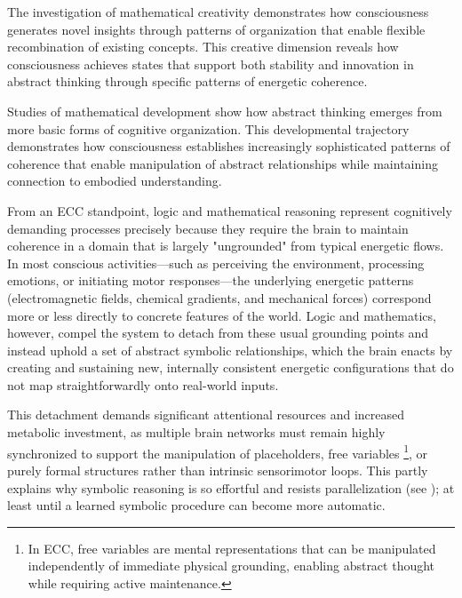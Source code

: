 \begin{refsection}
The investigation of mathematical creativity \cite{Hadamard1945} demonstrates how consciousness generates novel insights through patterns of organization that enable flexible recombination of existing concepts. This creative dimension reveals how consciousness achieves states that support both stability and innovation in abstract thinking through specific patterns of energetic coherence.

Studies of mathematical development \cite{Piaget1952} show how abstract thinking emerges from more basic forms of cognitive organization. This developmental trajectory demonstrates how consciousness establishes increasingly sophisticated patterns of coherence that enable manipulation of abstract relationships while maintaining connection to embodied understanding.

From an ECC standpoint, logic and mathematical reasoning represent cognitively demanding processes precisely because they require the brain to maintain coherence in a domain that is largely "ungrounded" from typical energetic flows. In most conscious activities—such as perceiving the environment, processing emotions, or initiating motor responses—the underlying energetic patterns (electromagnetic fields, chemical gradients, and mechanical forces) correspond more or less directly to concrete features of the world. Logic and mathematics, however, compel the system to detach from these usual grounding points and instead uphold a set of abstract symbolic relationships, which the brain enacts by creating and sustaining new, internally consistent energetic configurations that do not map straightforwardly onto real-world inputs.

This detachment demands significant attentional resources and increased metabolic investment, as multiple brain networks must remain highly synchronized to support the manipulation of placeholders, free variables \footnote{In ECC, free variables are mental representations that can be manipulated independently of immediate physical grounding, enabling abstract thought while requiring active maintenance.}, or purely formal structures rather than intrinsic sensorimotor loops. This partly explains why symbolic reasoning is so effortful and resists parallelization (see \cite{Dehaene2011, kahneman2011thinking}); at least until a learned symbolic procedure can become more automatic.


\end{refsection}
